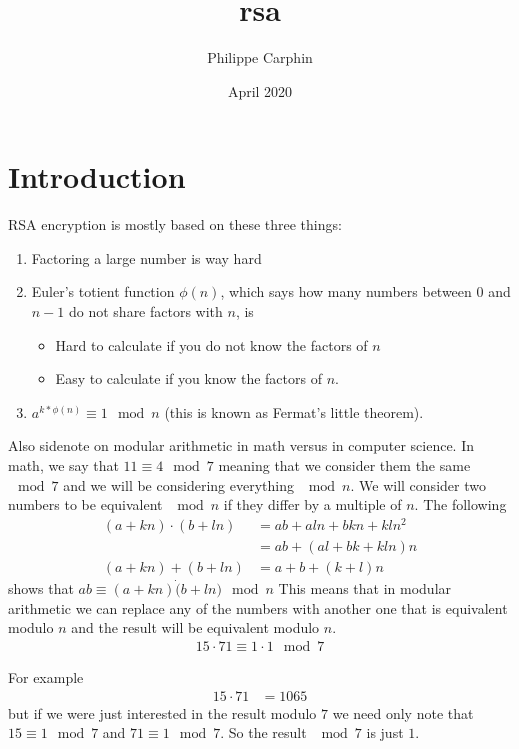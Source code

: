 \documentclass{article}
\title{rsa}
\author{Philippe Carphin}
\date{April 2020}
\begin{document}
\maketitle

\section{Introduction}
RSA encryption is mostly based on these three things:
\begin{enumerate}


\item Factoring a large number is way hard
\item Euler's totient function $\phi(n)$, which says how many numbers between $0$ and $n-1$ do not share factors with $n$, is
\begin{itemize}
    \item Hard to calculate if you do not know the factors of $n$
    \item Easy to calculate if you know the factors of $n$.
\end{itemize}
\item $a^{k*\phi(n)} \equiv 1 \mod{n}$ (this is known as Fermat's little theorem).

\end{enumerate}
Also sidenote on modular arithmetic in math versus in computer science.  In math, we say that $11 \equiv 4 \mod{7}$ meaning that we consider them the same $\mod{7}$ and we will be considering everything $\mod{n}$.  We will consider two numbers to be equivalent $\mod{n}$ if they differ by a multiple of $n$.  The following
\begin{align}
    (a + kn) \cdot (b + ln) &= ab + aln + bkn + kln^2 \\
    &= ab + (al + bk + kln)n \\
    (a + kn) + (b + ln) &= a + b + (k+l)n
\end{align}
shows that $ab \equiv (a+kn)\dot(b+ln) \mod{n}$
This means that in modular arithmetic we can replace any of the numbers with another one that is equivalent modulo $n$ and the result will be equivalent modulo $n$.
\begin{align}
    15 \cdot 71 \equiv 1 \cdot 1 \mod{7}
\end{align}

For example
\begin{align}
    15 \cdot 71 &= 1065
\end{align}
but if we were just interested in the result modulo $7$ we need only note that $15 \equiv 1 \mod{7}$ and $71 \equiv 1 \mod{7}$.  So the result $\mod{7}$ is just $1$.
\end{document}
